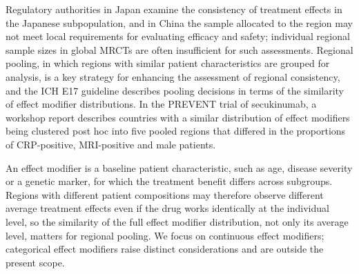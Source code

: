 \documentclass[AMA,Times1COL]{WileyNJDv5}
\begin{document}
Regulatory authorities in Japan examine the consistency of treatment effects in the Japanese subpopulation,\cite{matsushima2024} and in China the sample allocated to the region may not meet local requirements for evaluating efficacy and safety;\cite{song2025} individual regional sample sizes in global MRCTs are often insufficient for such assessments. Regional pooling, in which regions with similar patient characteristics are grouped for analysis, is a key strategy for enhancing the assessment of regional consistency, and the ICH E17 guideline describes pooling decisions in terms of the similarity of effect modifier distributions.\cite{iche17} In the PREVENT trial of secukinumab, a workshop report describes countries with a similar distribution of effect modifiers being clustered post hoc into five pooled regions that differed in the proportions of CRP-positive, MRI-positive and male patients.\cite{matsushima2024}

An effect modifier is a baseline patient characteristic, such as age, disease severity or a genetic marker, for which the treatment benefit differs across subgroups. Regions with different patient compositions may therefore observe different average treatment effects even if the drug works identically at the individual level, so the similarity of the full effect modifier distribution, not only its average level, matters for regional pooling. We focus on continuous effect modifiers; categorical effect modifiers raise distinct considerations and are outside the present scope.
\end{document}
